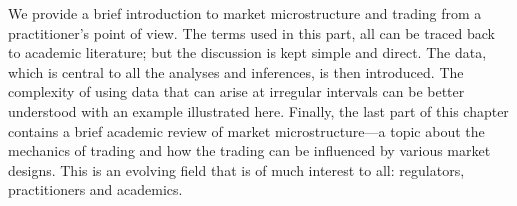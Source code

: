 
We provide a brief introduction to market microstructure and trading from a practitioner's point of view. The terms used in this part, all can be traced back to academic literature; but the discussion is kept simple and direct. The data, which is central to all the analyses and inferences, is then introduced. The complexity of using data that can arise at irregular intervals can be better understood with an example illustrated here. Finally, the last part of this chapter contains a brief academic review of market microstructure---a topic about the mechanics of trading and how the trading can be influenced by various market designs. This is an evolving field that is of much interest to all: regulators, practitioners and academics. 